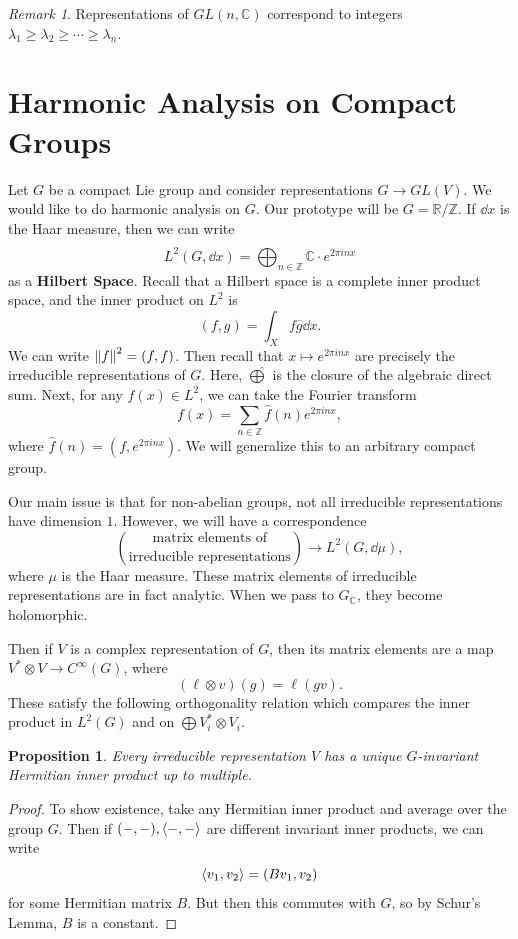 \documentclass[leqno, openany]{memoir}
\newtheorem{prop}[thm]{Proposition}
\theoremstyle{definition}
\theoremstyle{remark}
\newtheorem{rmk}[thm]{Remark}
\theoremstyle{plain}
\theoremstyle{definition}
\theoremstyle{remark}
\newcommand{\R}{\mathbb{R}}
\newcommand{\C}{\mathbb{C}}
\newcommand{\Z}{\mathbb{Z}}
\newcommand{\ol}[1]{\overline{#1}}
\newcommand{\wh}[1]{\widehat{#1}}
\begin{document}
\begin{rmk}
    Representations of $GL(n, \C)$ correspond to integers $\lambda_1 \geq \lambda_2 \geq \cdots \geq \lambda_n$.
\end{rmk}

\section{Harmonic Analysis on Compact Groups}%
\label{sec:harmonic_analysis}

Let $G$ be a compact Lie group and consider representations $G \to GL(V)$. We would like to do harmonic analysis on $G$. Our prototype will be $G = \R/\Z$. If $\dd{x}$ is the Haar measure, then we can write
\[ L^2(G, \dd{x}) = \wh{\bigoplus_{n \in \Z}} \C \cdot e^{2\pi i n x} \]
as a \textbf{Hilbert Space}. Recall that a Hilbert space is a complete inner product space, and the inner product on $L^2$ is
\[ (f,g) = \int_{X} f \ol{g} \dd{x}. \]
We can write $\norm{f}^2 = (f,f)$. Then recall that $x \mapsto e^{2 \pi i n x}$ are precisely the irreducible representations of $G$. Here, $\wh{\bigoplus}$ is the closure of the algebraic direct sum. Next, for any $f(x) \in L^2$, we can take the Fourier transform
\[ f(x) = \sum_{n \in \Z} \wh{f}(n) e^{2 \pi i n x}, \]
where $\wh{f}(n) = (f, e^{2 \pi i n x})$. We will generalize this to an arbitrary compact group.

Our main issue is that for non-abelian groups, not all irreducible representations have dimension $1$. However, we will have a correspondence
\[ \binom{\text{matrix elements of}}{\text{irreducible representations}} \longrightarrow L^2(G, \dd{\mu}), \]
where $\mu$ is the Haar measure. These matrix elements of irreducible representations are in fact analytic. When we pass to $G_{\C}$, they become holomorphic.

Then if $V$ is a complex representation of $G$, then its matrix elements are a map $V^* \otimes V \to C^{\infty}(G)$, where
\[ ( \ell \otimes v )(g) = \ell(gv). \]
These satisfy the following orthogonality relation which compares the inner product in $L^2(G)$ and on $\bigoplus V_i^* \otimes V_i$. 

\begin{prop}
    Every irreducible representation $V$ has a unique $G$-invariant Hermitian inner product up to multiple.
\end{prop}

\begin{proof}
    To show existence, take any Hermitian inner product and average over the group $G$. Then if $(-,-), \ev{-,-}$ are different invariant inner products, we can write
    \[ \ev{v_1, v_2} = (Bv_1, v_2) \]
    for some Hermitian matrix $B$. But then this commutes with $G$, so by Schur's Lemma, $B$ is a constant.
\end{proof}
\end{document}
